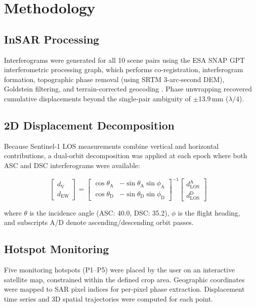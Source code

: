 \documentclass[conference]{IEEEtran}
\begin{document}
\section{Methodology}
\subsection{InSAR Processing}
Interferograms were generated for all 10 scene pairs using the ESA SNAP GPT
interferometric processing graph, which performs co-registration, interferogram
formation, topographic phase removal (using SRTM 3-arc-second DEM), Goldstein
filtering, and terrain-corrected geocoding \cite{snap2023}.
Phase unwrapping recovered cumulative displacements beyond the single-pair
ambiguity of $\pm$13.9\,mm ($\lambda/4$).

\subsection{2D Displacement Decomposition}
Because Sentinel-1 LOS measurements combine vertical and horizontal
contributions, a dual-orbit decomposition \cite{wright2004} was applied at
each epoch where both ASC and DSC interferograms were available:

\begin{equation}
  \begin{bmatrix} d_\text{V} \\ d_\text{EW} \end{bmatrix}
  =
  \begin{bmatrix}
    \cos\theta_\text{A} & -\sin\theta_\text{A}\sin\phi_\text{A} \\
    \cos\theta_\text{D} & -\sin\theta_\text{D}\sin\phi_\text{D}
  \end{bmatrix}^{-1}
  \begin{bmatrix} d_\text{LOS}^\text{A} \\ d_\text{LOS}^\text{D} \end{bmatrix}
  \label{eq:decomp}
\end{equation}

\noindent where $\theta$ is the incidence angle (ASC: 40.0\textdegree{},
DSC: 35.2\textdegree{}), $\phi$ is the flight heading, and subscripts A/D
denote ascending/descending orbit passes.

\subsection{Hotspot Monitoring}
Five monitoring hotspots (P1--P5) were placed by the user on an interactive
satellite map, constrained within the defined crop area. Geographic coordinates
were mapped to SAR pixel indices for per-pixel phase extraction. Displacement
time series and 3D spatial trajectories were computed for each point.
\end{document}
